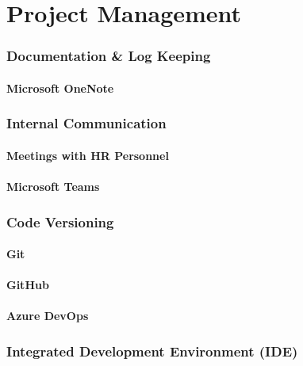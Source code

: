 \part{Project Management}

\section{Documentation \& Log Keeping}

    \subsection{Microsoft OneNote}

\section{Internal Communication}

    \subsection{Meetings with HR Personnel}

    \subsection{Microsoft Teams}

\section{Code Versioning}

    \subsection{Git}

    \subsection{GitHub}

    \subsection{Azure DevOps}

\section{Integrated Development Environment (IDE)}

